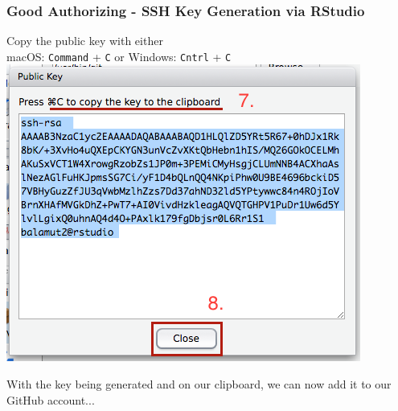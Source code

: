 \documentclass{beamer}\usepackage[]{graphicx}\usepackage[]{color}
\begin{document}
\begin{frame}[fragile]
\frametitle{Good Authorizing - SSH Key Generation via RStudio}


\begin{block}{Copy the public key with either \\ macOS: \texttt{Command} + \texttt{C} or Windows: \texttt{Cntrl} + \texttt{C}}
\centering
\includegraphics[scale=0.35]{img/ssh/rstudio_public_key.png}
\end{block}

With the key being generated and on our clipboard, we can now add it to our GitHub account... 

\end{frame}
\end{document}
